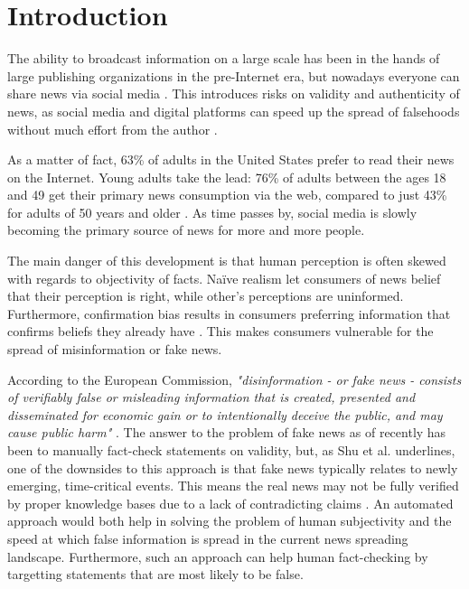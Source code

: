 \section{Introduction}
The ability to broadcast information on a large scale has been in the hands of large publishing organizations in the pre-Internet era, but nowadays everyone can share news via social media \cite{howell2013}. 
This introduces risks on validity and authenticity of news, as social media and digital platforms can speed up the spread of falsehoods without much effort from the author \cite{europeancommission2018}. 

As a matter of fact, 63\% of adults in the United States prefer to read their news on the Internet. 
Young adults take the lead: 76\% of adults between the ages 18 and 49 get their primary news consumption via the web, compared to just 43\% for adults of 50 years and older \cite{mitchell2018}.
As time passes by, social media is slowly becoming the primary source of news for more and more people. 

The main danger of this development is that human perception is often skewed with regards to objectivity of facts. 
Naïve realism let consumers of news belief that their perception is right, while other's perceptions are uninformed. 
Furthermore, confirmation bias results in consumers preferring information that confirms beliefs they already have \cite{shu2017}. 
This makes consumers vulnerable for the spread of misinformation or fake news. 

According to the European Commission, \textit{"disinformation - or fake news - consists of verifiably false or misleading information that is created, presented and disseminated for economic gain or to intentionally deceive the public, and may cause public harm"} \cite{europeancommission2018}. 
The answer to the problem of fake news as of recently has been to manually fact-check statements on validity, but, as Shu et al. underlines, one of the downsides to this approach is that fake news typically relates to newly emerging, time-critical events. 
This means the real news may not be fully verified by proper knowledge bases due to a lack of contradicting claims \cite{shu2017}. 
An automated approach would both help in solving the problem of human subjectivity and the speed at which false information is spread in the current news spreading landscape.
Furthermore, such an approach can help human fact-checking by targetting statements that are most likely to be false.

